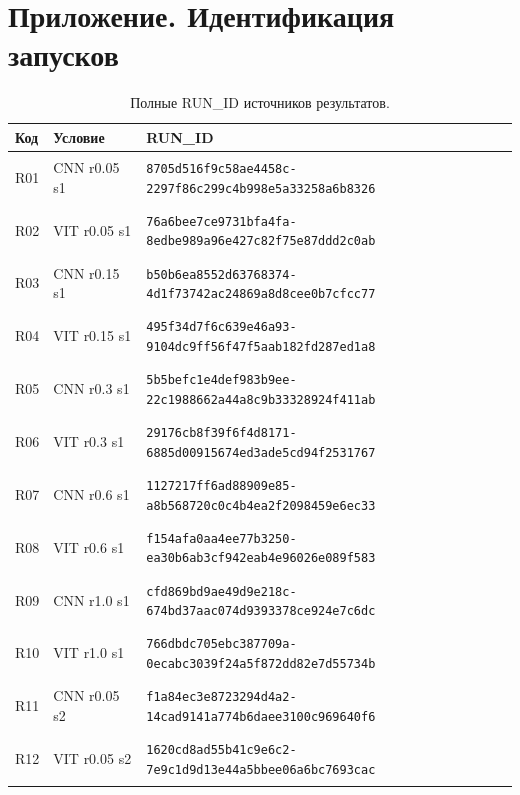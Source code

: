\section*{Приложение. Идентификация запусков}
\begingroup\small{}
\begin{longtable}{@{}l>{\raggedright\arraybackslash}p{3.5cm}p{10.8cm}@{}}
\caption{Полные RUN\_ID источников результатов.}\\
\toprule Код & Условие & RUN\_ID \\ \midrule \endhead
\hypertarget{R01}{R01} & CNN r0.05 s1 & {\fontsize{8.8}{11}\selectfont\texttt{8705d516f9c58ae4458c-2297f86c299c4b998e5a33258a6b8326}} \\
\hypertarget{R02}{R02} & VIT r0.05 s1 & {\fontsize{8.8}{11}\selectfont\texttt{76a6bee7ce9731bfa4fa-8edbe989a96e427c82f75e87ddd2c0ab}} \\
\hypertarget{R03}{R03} & CNN r0.15 s1 & {\fontsize{8.8}{11}\selectfont\texttt{b50b6ea8552d63768374-4d1f73742ac24869a8d8cee0b7cfcc77}} \\
\hypertarget{R04}{R04} & VIT r0.15 s1 & {\fontsize{8.8}{11}\selectfont\texttt{495f34d7f6c639e46a93-9104dc9ff56f47f5aab182fd287ed1a8}} \\
\hypertarget{R05}{R05} & CNN r0.3 s1 & {\fontsize{8.8}{11}\selectfont\texttt{5b5befc1e4def983b9ee-22c1988662a44a8c9b33328924f411ab}} \\
\hypertarget{R06}{R06} & VIT r0.3 s1 & {\fontsize{8.8}{11}\selectfont\texttt{29176cb8f39f6f4d8171-6885d00915674ed3ade5cd94f2531767}} \\
\hypertarget{R07}{R07} & CNN r0.6 s1 & {\fontsize{8.8}{11}\selectfont\texttt{1127217ff6ad88909e85-a8b568720c0c4b4ea2f2098459e6ec33}} \\
\hypertarget{R08}{R08} & VIT r0.6 s1 & {\fontsize{8.8}{11}\selectfont\texttt{f154afa0aa4ee77b3250-ea30b6ab3cf942eab4e96026e089f583}} \\
\hypertarget{R09}{R09} & CNN r1.0 s1 & {\fontsize{8.8}{11}\selectfont\texttt{cfd869bd9ae49d9e218c-674bd37aac074d9393378ce924e7c6dc}} \\
\hypertarget{R10}{R10} & VIT r1.0 s1 & {\fontsize{8.8}{11}\selectfont\texttt{766dbdc705ebc387709a-0ecabc3039f24a5f872dd82e7d55734b}} \\
\hypertarget{R11}{R11} & CNN r0.05 s2 & {\fontsize{8.8}{11}\selectfont\texttt{f1a84ec3e8723294d4a2-14cad9141a774b6daee3100c969640f6}} \\
\hypertarget{R12}{R12} & VIT r0.05 s2 & {\fontsize{8.8}{11}\selectfont\texttt{1620cd8ad55b41c9e6c2-7e9c1d9d13e44a5bbee06a6bc7693cac}} \\

\end{longtable}
